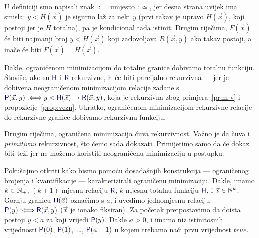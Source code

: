 \begin{napomena}[{name=[ograničena minimizacija čuva rekurzivnost]}]\label{nap:min=H}
U definiciji smo napisali znak $:=$ umjesto $:\simeq$, jer desna strana uvijek ima smisla: $y<H(\vec x)$ je sigurno laž za neki $y$ (prvi takav je upravo $H(\vec x)$, koji postoji jer je $H$ totalna), pa je kondicional tada istinit. Drugim riječima, $F(\vec x)$ će biti najmanji broj $y<H(\vec x)$ koji zadovoljava $R(\vec x,y)$ ako takav postoji, a inače će biti $F(\vec x)=H(\vec x)$.

Dakle, ograničenom minimizacijom do totalne granice dobivamo totalnu funkciju. Štoviše, ako su $\f H$ i $\f R$ rekurzivne, $\f F$ će biti parcijalno rekurzivna --- jer je dobivena neograničenom minimizacijom relacije zadane s $\f P(\vec x,y):\Longleftrightarrow y<\f H(\vec x)\to\f R(\vec x,y)$, koja je rekurzivna zbog primjera~\ref{pr:m-v} i propozicije~\ref{prop:vezn}. Ukratko, ograničenom minimizacijom rekurzivne relacije do rekurzivne granice
dobivamo rekurzivnu funkciju.
\end{napomena}

Drugim riječima, ograničena minimizacija čuva rekurzivnost. Važno je da čuva i \emph{primitivnu} rekurzivnost, što ćemo sada dokazati. Primijetimo samo da će dokaz biti teži jer ne možemo koristiti neograničenu minimizaciju u postupku.


Pokušajmo otkriti kako bismo pomoću dosadašnjih konstrukcija --- ograničenog brojenja i kvantifikacije --- karakterizirali ograničenu minimizaciju. Dakle, imamo $k\in{\mathbb N}_+$, $(k+1)$-mjesnu relaciju $\f R$, $k$-mjesnu totalnu funkciju $\f H$, i $\vec x\in{\mathbb N}^k$. Gornju granicu $\f H(\vec x)$ označimo s $a$, i uvedimo jednomjesnu relaciju $\f P(y):\Longleftrightarrow\f R(\vec x,y)$ ($\vec x$ je ionako fiksiran). Za početak pretpostavimo da doista postoji $y<a$ za koji vrijedi $\f P(y)$. Dakle $a>0$, i imamo niz istinitosnih vrijednosti $\f P(0)$, $\f P(1)$,~\ldots, $\f P(a-1)$ u kojem trebamo naći prvu vrijednost $\mathit{true}$.


